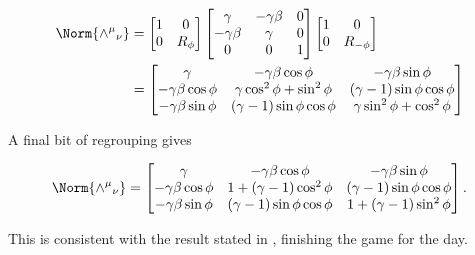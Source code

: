 \begin{align*}
\Norm{{\wedge^\mu}_\nu} &=
\begin{bmatrix}
1 & 0 \\
0 & R_{\phi}
\end{bmatrix}
\begin{bmatrix}
\gamma & -\gamma \beta & 0 \\
-\gamma \beta & \gamma & 0 \\
0 & 0 & 1
\end{bmatrix}
\begin{bmatrix}
1 & 0 \\
0 & R_{-\phi}
\end{bmatrix} \\
&=
\begin{bmatrix}
\gamma & - \gamma \beta \cos\phi & -\gamma \beta \sin\phi \\
-\gamma \beta \cos\phi & \gamma \cos^2\phi + \sin^2 \phi & (\gamma -1) \sin\phi \cos\phi \\
-\gamma \beta \sin\phi & (\gamma -1) \sin\phi \cos\phi & \gamma \sin^2\phi + \cos^2\phi \\
\end{bmatrix} \\
\end{align*}

A final bit of regrouping gives

\begin{equation}\label{eqn:complexPlanarBoost:250}
\Norm{{\wedge^\mu}_\nu} 
=
\begin{bmatrix}
\gamma & - \gamma \beta \cos\phi & -\gamma \beta \sin\phi \\
-\gamma \beta \cos\phi & 1 + ( \gamma -1) \cos^2\phi & (\gamma -1) \sin\phi \cos\phi \\
-\gamma \beta \sin\phi & (\gamma -1) \sin\phi \cos\phi & 1 + (\gamma -1) \sin^2\phi \\
\end{bmatrix}.
\end{equation}

This is consistent with the result stated in \cite{wiki:LorentzBoost}, finishing the game for the day.

\EndNoBibArticle
